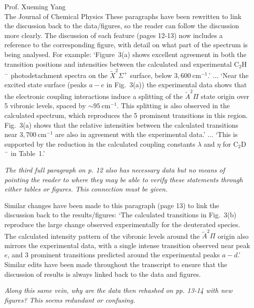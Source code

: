 \documentclass[a4paper,12pt]{letter}
\begin{document}
\begin{sf}
\begin{letter}{%
Prof. Xueming Yang\\
The Journal of Chemical Physics
}
These paragraphs have been rewritten to link the discussion back to the data/figures, so the reader can follow the discussion more clearly. The discussion of each feature (pages 12-13) now includes a reference to the corresponding figure, with detail on what part of the spectrum is being analysed. For example: `Figure~3(a) shows excellent agreement in both the transition positions and intensities between the calculated and experimental C$_2$H$^-$ photodetachment spectra on the $\tilde{X} ^2\Sigma^+$ surface, below $3,600~$cm$^{-1}$.' $\dots$ `Near the excited state surface (peaks $a-e$ in Fig.~3(a)) the experimental data shows that the electronic coupling interactions induce a splitting of the $\tilde{A} ^2\Pi$ state origin over 5 vibronic levels, spaced by $\sim 95~$cm$^{-1}$. This splitting is also observed in the calculated spectrum, which reproduces the 5 prominent transitions in this region. Fig.~3(a) shows that the relative intensities between the calculated transitions near $3,700~$cm$^{-1}$ are also in agreement with the experimental data.' $\dots$ `This is supported by the reduction in the calculated coupling constants $\lambda$ and $\eta$ for C$_2$D$^-$ in Table~1.'

\emph{The third full paragraph on p. 12 also has necessary data but no means of pointing the reader to where they may be able to verify these statements through either tables or figures. This connection must be given.}

Similar changes have been made to this paragraph (page 13) to link the discussion back to the results/figures: `The calculated transitions in Fig.~3(b) reproduce the large change observed experimentally for the deuterated species. The calculated intensity pattern of the vibronic levels around the $\tilde{A} ^2\Pi$ origin also mirrors the experimental data, with a single intense transition observed near peak $e$, and 3 prominent transitions predicted around the experimental peaks $a-d$.' Similar edits have been made throughout the transcript to ensure that the discussion of results is always linked back to the data and figures.

\emph{Along this same vein, why are the data then rehashed on pp. 13-14 with new figures? This seems redundant or confusing.}


\end{letter}
\end{sf}
\end{document}
